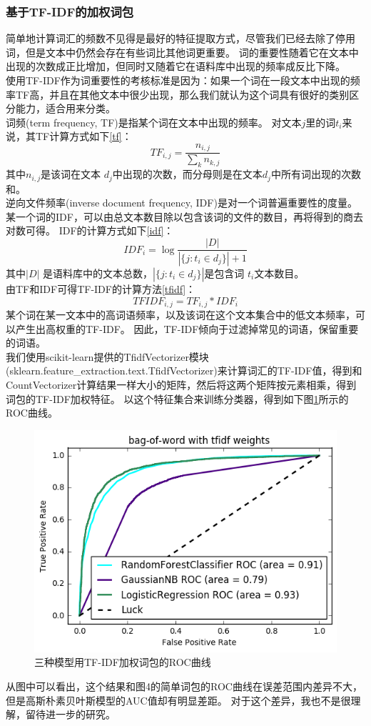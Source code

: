 \subsubsection{基于TF-IDF的加权词包}
简单地计算词汇的频数不见得是最好的特征提取方式，尽管我们已经去除了停用词，但是文本中仍然会存在有些词比其他词更重要。
词的重要性随着它在文本中出现的次数成正比增加，但同时又随着它在语料库中出现的频率成反比下降。\\
使用TF-IDF作为词重要性的考核标准是因为：如果一个词在一段文本中出现的频率TF高，并且在其他文本中很少出现，那么我们就认为这个词具有很好的类别区分能力，适合用来分类。\\
词频(term frequency, TF)是指某个词在文本中出现的频率。
对文本$ j $里的词$ t_i $来说，其TF计算方式如下\ref{tf}：
\begin{equation}\label{tf}
  TF_{i, j} = \frac{n_{i, j}}{\sum_{k}n_{k, j}}
\end{equation}
其中$ n_{i, j}$是该词在文本 $ d_j $中出现的次数，而分母则是在文本$ d_j $中所有词出现的次数和。\\
逆向文件频率(inverse document frequency, IDF)是对一个词普遍重要性的度量。
某一个词的IDF，可以由总文本数目除以包含该词的文件的数目，再将得到的商去对数可得。
IDF的计算方式如下\ref{idf}：
\begin{equation}\label{idf}
  IDF_i = \log\frac{{| D |}}{| \{ j: t_i \in d_j \} | + 1}
\end{equation}
其中$ | D | $ 是语料库中的文本总数，$ | \{ j : t_i \in d_j \} | $是包含词 $ t_i $文本数目。\\
由TF和IDF可得TF-IDF的计算方法\ref{tfidf}：
\begin{equation}\label{tfidf}
  TFIDF_{i, j} = TF_{i, j} * IDF_{i}
\end{equation}
某个词在某一文本中的高词语频率，以及该词在这个文本集合中的低文本频率，可以产生出高权重的TF-IDF。
因此，TF-IDF倾向于过滤掉常见的词语，保留重要的词语。\\
我们使用scikit-learn提供的TfidfVectorizer模块(sklearn.feature\_extraction.text.TfidfVectorizer)来计算词汇的TF-IDF值，得到和CountVectorizer计算结果一样大小的矩阵，然后将这两个矩阵按元素相乘，得到词包的TF-IDF加权特征。
以这个特征集合来训练分类器，得到如下图\ref{fig:3croctfidf}所示的ROC曲线。
\begin{figure}[h]
\centering
\includegraphics[width=0.9\linewidth]{3c_roc_tfidf}
\caption[roctfidf]{三种模型用TF-IDF加权词包的ROC曲线}
\label{fig:3croctfidf}
\end{figure}

从图中可以看出，这个结果和图4的简单词包的ROC曲线在误差范围内差异不大，但是高斯朴素贝叶斯模型的AUC值却有明显差距。
对于这个差异，我也不是很理解，留待进一步的研究。\\